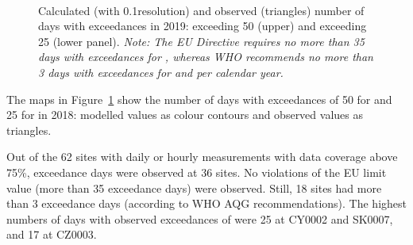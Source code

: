 \begin{figure}[ht]
  \\
  \vspace{0.5cm}
\caption{Calculated (with 0.1\degrees resolution) and observed (triangles) number of days with
  exceedances in 2019: \PM[10] exceeding 50 \ug (upper) and \PM[2.5]
  exceeding 25 \ug (lower panel). \textit{Note: The EU Directive requires no
    more than 35 days with exceedances for \PM[10], whereas WHO
    recommends no more than 3 days with exceedances for \PM[10] and
    \PM[2.5] per calendar year. }}
\label{fig:PMexceed}
\end{figure}


The maps in Figure~\ref{fig:PMexceed} show the number of days with
exceedances of 50 \ug for \PM[10] and 25 \ug for \PM[2.5] in 2018:
modelled values as colour contours and observed values as triangles.

Out of the 62 sites with daily or hourly \PM[10] measurements with data
coverage above 75\%, exceedance days were observed at 36 sites. No
violations of the \PM[10] EU limit value (more than 35 exceedance
days) were observed. Still, 18 sites had more than 3 exceedance days
(according to WHO AQG recommendations). The highest numbers of days
with observed exceedances of \PM[10] were 25 at CY0002 and SK0007, and 17
at CZ0003.

